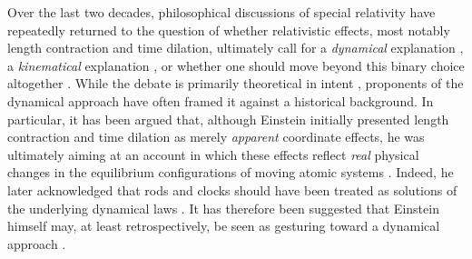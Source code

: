 \documentclass[pdflatex]{sn-jnl} %
\begin{document}
Over the last two decades, philosophical discussions of special relativity have repeatedly returned to the question of whether relativistic effects, most notably length contraction and time dilation, ultimately call for a \emph{dynamical} explanation \citep{Brown2005,Brown2006}, a \emph{kinematical} explanation \citep{Norton2008,Janssen2009}, or whether one should move beyond this binary choice altogether \citep{Acuna2016}. While the debate is primarily theoretical in intent \citep{Read2020a,Acuña2025}, proponents of the dynamical approach have often framed it against a historical background. In particular, it has been argued that, although Einstein initially presented length contraction and time dilation as merely \emph{apparent} coordinate effects, he was ultimately aiming at an account in which these effects reflect \emph{real} physical changes in the equilibrium configurations of moving atomic systems \citep{Brown2022}. Indeed, he later acknowledged that rods and clocks should have been treated as solutions of the underlying dynamical laws \citep[61]{Einstein1949}. It has therefore been suggested that Einstein himself may, at least retrospectively, be seen as gesturing toward a dynamical approach \citep[70]{Brown2022}. 


\end{document}
